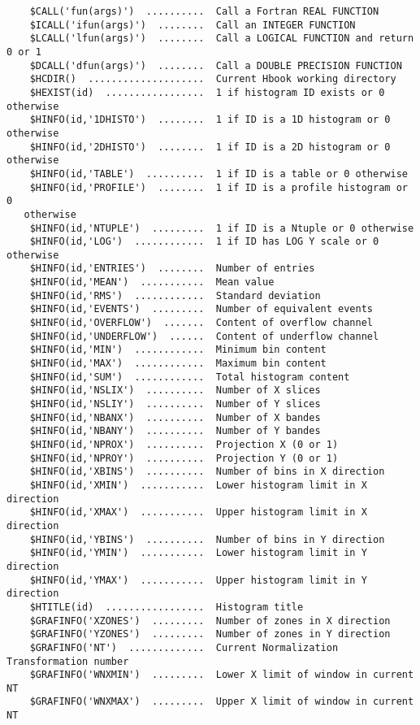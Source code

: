 \begin{verbatim}
    $CALL('fun(args)')  ..........  Call a Fortran REAL FUNCTION
    $ICALL('ifun(args)')  ........  Call an INTEGER FUNCTION
    $LCALL('lfun(args)')  ........  Call a LOGICAL FUNCTION and return 0 or 1
    $DCALL('dfun(args)')  ........  Call a DOUBLE PRECISION FUNCTION
    $HCDIR()  ....................  Current Hbook working directory
    $HEXIST(id)  .................  1 if histogram ID exists or 0 otherwise
    $HINFO(id,'1DHISTO')  ........  1 if ID is a 1D histogram or 0 otherwise
    $HINFO(id,'2DHISTO')  ........  1 if ID is a 2D histogram or 0 otherwise
    $HINFO(id,'TABLE')  ..........  1 if ID is a table or 0 otherwise
    $HINFO(id,'PROFILE')  ........  1 if ID is a profile histogram or 0 
   otherwise
    $HINFO(id,'NTUPLE')  .........  1 if ID is a Ntuple or 0 otherwise
    $HINFO(id,'LOG')  ............  1 if ID has LOG Y scale or 0 otherwise
    $HINFO(id,'ENTRIES')  ........  Number of entries
    $HINFO(id,'MEAN')  ...........  Mean value
    $HINFO(id,'RMS')  ............  Standard deviation
    $HINFO(id,'EVENTS')  .........  Number of equivalent events
    $HINFO(id,'OVERFLOW')  .......  Content of overflow channel
    $HINFO(id,'UNDERFLOW')  ......  Content of underflow channel
    $HINFO(id,'MIN')  ............  Minimum bin content
    $HINFO(id,'MAX')  ............  Maximum bin content
    $HINFO(id,'SUM')  ............  Total histogram content
    $HINFO(id,'NSLIX')  ..........  Number of X slices
    $HINFO(id,'NSLIY')  ..........  Number of Y slices
    $HINFO(id,'NBANX')  ..........  Number of X bandes
    $HINFO(id,'NBANY')  ..........  Number of Y bandes
    $HINFO(id,'NPROX')  ..........  Projection X (0 or 1)
    $HINFO(id,'NPROY')  ..........  Projection Y (0 or 1)
    $HINFO(id,'XBINS')  ..........  Number of bins in X direction
    $HINFO(id,'XMIN')  ...........  Lower histogram limit in X direction
    $HINFO(id,'XMAX')  ...........  Upper histogram limit in X direction
    $HINFO(id,'YBINS')  ..........  Number of bins in Y direction
    $HINFO(id,'YMIN')  ...........  Lower histogram limit in Y direction
    $HINFO(id,'YMAX')  ...........  Upper histogram limit in Y direction
    $HTITLE(id)  .................  Histogram title
    $GRAFINFO('XZONES')  .........  Number of zones in X direction
    $GRAFINFO('YZONES')  .........  Number of zones in Y direction
    $GRAFINFO('NT')  .............  Current Normalization Transformation number
    $GRAFINFO('WNXMIN')  .........  Lower X limit of window in current NT
    $GRAFINFO('WNXMAX')  .........  Upper X limit of window in current NT

\end{verbatim}
